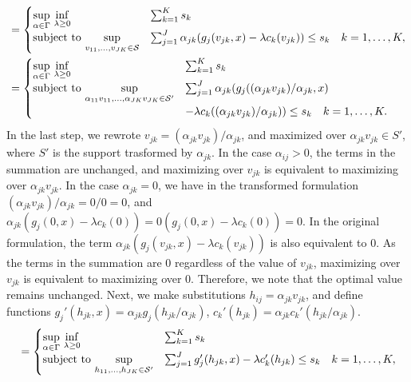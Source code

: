 \documentclass[12pt]{article}
\theoremstyle{thmstyleone}%
\theoremstyle{thmstyletwo}%
\theoremstyle{thmstylethree}%
\begin{document}
\begin{appendices}
{\begin{equation*}
\begin{aligned}
&= \begin{cases}
	\underset{\alpha \in \Gamma}{\sup}~\underset{\lambda \geq 0}{\inf} &\sum_{k=1}^K s_k  \\
	\mbox{subject to}~\underset{v_{11}, \dots, v_{JK} \in \mathcal{S}}{\sup}& \sum_{j=1}^J \alpha_{jk}(g_j(v_{jk}, x) - \lambda c_k(v_{jk})) \le s_k \quad k = 1,\dots,K,
\end{cases}\\
&= \begin{cases}
	\underset{\alpha \in \Gamma}{\sup}~\underset{\lambda \geq 0}{\inf} &\sum_{k=1}^K s_k  \\
	\mbox{subject to}~\underset{\alpha_{11}v_{11}, \dots, \alpha_{JK}v_{JK} \in \mathcal{S}'}{\sup}& \sum_{j=1}^J \alpha_{jk}(g_j((\alpha_{jk}v_{jk})/\alpha_{jk}, x) \\
	& - \lambda c_k((\alpha_{jk}v_{jk})/\alpha_{jk})) \le s_k \quad k = 1,\dots,K.
\end{cases}\\
\end{aligned}
\end{equation*}
In the last step, we rewrote $v_{jk} = (\alpha_{jk}v_{jk})/\alpha_{jk}$, and maximized over $\alpha_{jk}v_{jk} \in S'$, where $S'$ is the support trasformed by $\alpha_{jk}$. 
In the case $\alpha_{ij} > 0$, the terms in the summation are unchanged, and maximizing over $v_{jk}$ is equivalent to maximizing over $\alpha_{jk}v_{jk}$.
In the case $\alpha_{jk}= 0$, we have in the transformed formulation $(\alpha_{jk}v_{jk})/\alpha_{jk} = 0/0 = 0$, and $\alpha_{jk}(g_j(0, x) - \lambda c_k(0)) = 0(g_j(0, x) - \lambda c_k(0)) = 0$.
In the original formulation, the term $\alpha_{jk}(g_j(v_{jk}, x) - \lambda c_k(v_{jk}))$ is also equivalent to 0. 
As the terms in the summation are 0 regardless of the value of $v_{jk}$, maximizing over $v_{jk}$ is equivalent to maximizing over $0$.
Therefore, we note that the optimal value remains unchanged. 
Next, we make substitutions $h_{ij} = \alpha_{jk}v_{jk}$, and define functions $g_j'(h_{jk},x) = \alpha_{jk}g_j(h_{jk}/\alpha_{jk})$, $c_k'(h_{jk}) = \alpha_{jk}c_k'(h_{jk}/\alpha_{jk})$.
\begin{equation*}
	\begin{aligned}
&= \begin{cases}
	\underset{\alpha \in \Gamma}{\sup}~\underset{\lambda \geq 0}{\inf} &\sum_{k=1}^K s_k  \\
	\mbox{subject to}~\underset{h_{11}, \dots, h_{JK} \in \supp'}{\sup}& \sum_{j=1}^J g_j'(h_{jk}, x)- \lambda c_k'(h_{jk}) \le s_k \quad k = 1,\dots,K,
\end{cases}\\

\end{aligned}
\end{equation*}}
\end{appendices}
\end{document}
